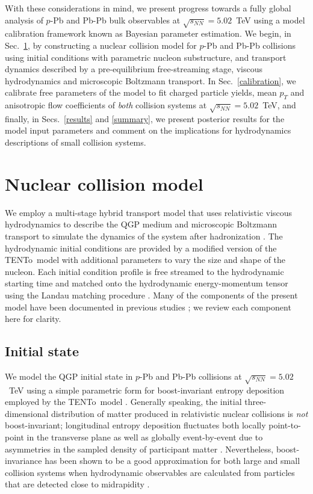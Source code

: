 \documentclass[aps,prc,reprint,amsmath,nofootinbib]{revtex4-1}
\newcommand{\trento}{T\raisebox{-0.5ex}{R}ENTo}
\newcommand{\sqrts}{\sqrt{s_{NN}}}
\begin{document}
With these considerations in mind, we present progress towards a fully global analysis of $p$-Pb and Pb-Pb bulk observables at $\sqrts=5.02$~TeV using a model calibration framework known as Bayesian parameter estimation.
We begin, in Sec.~\ref{model}, by constructing a nuclear collision model for $p$-Pb and Pb-Pb collisions using initial conditions with parametric nucleon substructure, and transport dynamics described by a pre-equilibrium free-streaming stage, viscous hydrodynamics and microscopic Boltzmann transport.
In Sec.~\ref{calibration}, we calibrate free parameters of the model to fit charged particle yields, mean $p_T$ and anisotropic flow coefficients of \emph{both} collision systems at $\sqrts=5.02$~TeV, and finally, in Secs.~\ref{results} and \ref{summary}, we present posterior results for the model input parameters and comment on the implications for hydrodynamics descriptions of small collision systems.


\section{Nuclear collision model}
\label{model}

We employ a multi-stage hybrid transport model that uses relativistic viscous hydrodynamics to describe the QGP medium and microscopic Boltzmann transport to simulate the dynamics of the system after hadronization \cite{Shen:2014vra, Bernhard:2016tnd}.
The hydrodynamic initial conditions are provided by a modified version of the \trento\ model \cite{Moreland:2014oya} with additional parameters to vary the size and shape of the nucleon.
Each initial condition profile is free streamed to the hydrodynamic starting time and matched onto the hydrodynamic energy-momentum tensor using the Landau matching procedure \cite{Broniowski:2008qk, Heinz:2015arc}.
Many of the components of the present model have been documented in previous studies \cite{Moreland:2014oya, Bernhard:2016tnd, Bernhard:2018hnz}; we review each component here for clarity.

\subsection{Initial state}

We model the QGP initial state in $p$-Pb and Pb-Pb collisions at $\sqrts=5.02$~TeV using a simple parametric form for boost-invariant entropy deposition employed by the \trento\ model \cite{Moreland:2014oya}.
Generally speaking, the initial three-dimensional distribution of matter produced in relativistic nuclear collisions is \emph{not} boost-invariant; longitudinal entropy deposition fluctuates both locally point-to-point in the transverse plane as well as globally event-by-event due to asymmetries in the sampled density of participant matter \cite{Ke:2016jrd, Bozek:2010vz}.
Nevertheless, boost-invariance has been shown to be a good approximation for both large and small collision systems when hydrodynamic observables are calculated from particles that are detected close to midrapidity \cite{Shen:2016zpp}.
\end{document}
